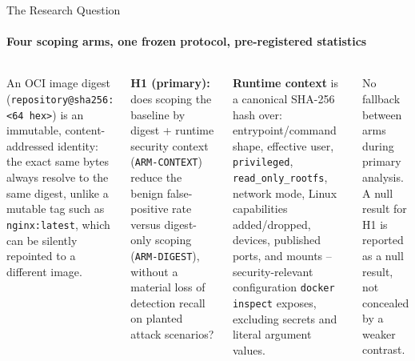 \documentclass[aspectratio=169, 11pt]{beamer}
\begin{document}
\begin{frame}{The Research Question}
\framesubtitle{Four scoping arms, one frozen protocol, pre-registered statistics}

\begin{columns}[T]
\footnotesize
An OCI image digest (\texttt{repository@sha256:<64 hex>}) is an immutable,
content-addressed identity: the exact same bytes always resolve to the same
digest, unlike a mutable tag such as \texttt{nginx:latest}, which can be
silently repointed to a different image.

\medskip
\textbf{H1 (primary):} does scoping the baseline by digest + runtime security
context (\texttt{ARM-CONTEXT}) reduce the benign false-positive rate versus
digest-only scoping (\texttt{ARM-DIGEST}), without a material loss of
detection recall on planted attack scenarios?

\medskip
\textbf{Runtime context} is a canonical SHA-256 hash over: entrypoint/command
shape, effective user, \texttt{privileged}, \texttt{read\_only\_rootfs},
network mode, Linux capabilities added/dropped, devices, published ports, and
mounts -- security-relevant configuration \texttt{docker inspect} exposes,
excluding secrets and literal argument values.

\centering
{}

\smallskip
{\scriptsize No fallback between arms during primary analysis. A null result
for H1 is reported as a null result, not concealed by a weaker contrast.}
\end{columns}
\end{frame}
\end{document}
